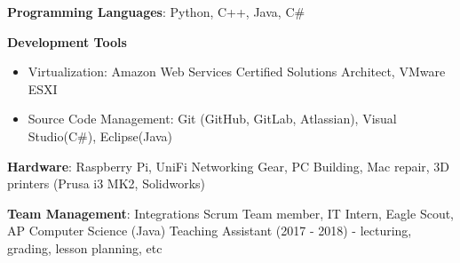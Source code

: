 \vspace{-2.0mm}


\begin{cventries}
\vspace{-5mm}
  \cventry
    {}
    {}
    {}
    {}
    {
      \begin{cvitems}
        \item {\textbf{Programming Languages}: Python, C++, Java, C\#}
        \item {\textbf{Development Tools}}
        \begin{itemize}
        \item {Virtualization: Amazon Web Services
            Certified Solutions Architect, VMware ESXI}
        \item {Source Code Management: Git (GitHub, GitLab, Atlassian),
            Visual Studio(C\#), Eclipse(Java)}
        \end {itemize}
        \item {\textbf{Hardware}: Raspberry Pi, UniFi Networking Gear,
            PC Building, Mac repair, 3D printers (Prusa i3 MK2,
            Solidworks)}
        \item {\textbf{Team Management}:  Integrations Scrum Team
            member, IT Intern, Eagle Scout, AP Computer Science (Java) Teaching
            Assistant (2017 - 2018) - lecturing, grading, lesson
            planning, etc}
      \end{cvitems}
    }
\end{cventries}
